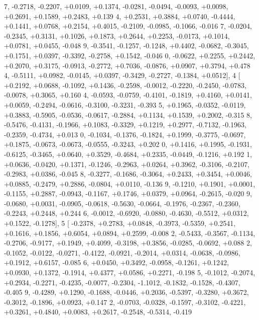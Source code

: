 \begin{DoxyCode}
      7, -0.2718, -0.2207, +0.0109, +0.1374, -0.0281, -0.0494, -0.0093, +0.0098, +0.2691, +0.1589, +0.2483, +0.139
      4, +0.2531, +0.3884, +0.0740, -0.4444, +0.1441, +0.0768, +0.2154, +0.4015, -0.2109, -0.0985, -0.1066, -0.016
      7, -0.0204, -0.2345, +0.3131, +0.1026, +0.1873, +0.2644, +0.2253, -0.0173, +0.1014, +0.0781, +0.0455, -0.048
      9, -0.3541, -0.1257, -0.1248, +0.4402, -0.0682, -0.3045, +0.1751, +0.0397, -0.3392, -0.2758, +0.1542, -0.046
      0, -0.0622, +0.2255, +0.2442, +0.2070, +0.3175, -0.0913, -0.2772, +0.7036, -0.0876, +0.0907, +0.3794, +0.478
      4, -0.5111, +0.0982, -0.0145, +0.0397, -0.3429, -0.2727, -0.1384, +0.0512],
4 [ +0.2192, +0.0688, -0.1092, +0.1436, -0.2598, -0.0012, -0.2220, -0.2450, -0.0783, -0.0078, +0.3065, +0.160
      4, -0.0593, -0.0759, -0.4101, -0.1819, +0.4160, +0.0141, +0.0059, -0.2494, -0.0616, -0.3100, -0.3231, -0.393
      5, +0.1965, -0.0352, -0.0119, +0.3883, -0.5905, -0.0536, -0.0617, -0.2884, +0.1134, +0.1539, +0.2002, -0.315
      8, -0.5476, -0.4131, -0.1966, +0.1083, -0.3329, +0.1219, +0.2977, -0.7132, -0.1963, -0.2359, -0.4734, +0.013
      0, -0.1034, -0.1376, -0.1824, +0.1999, -0.3775, -0.0697, +0.1875, -0.0673, -0.0673, -0.0555, -0.3243, +0.202
      0, +0.1416, +0.1995, -0.1931, -0.6125, -0.3465, +0.0640, +0.3529, -0.4684, +0.2335, -0.0449, -0.1216, +0.192
      1, +0.0636, -0.0420, +0.1371, -0.1246, -0.2963, +0.0264, +0.3962, -0.3106, -0.2107, -0.2983, +0.0386, -0.045
      8, -0.3277, -0.1686, -0.3064, +0.2433, +0.3454, +0.0046, +0.0885, -0.2479, +0.2886, -0.0804, +0.0110, -0.136
      9, -0.1210, +0.1901, +0.0001, -0.1155, +0.2887, -0.0943, -0.1167, +0.1746, +0.0379, +0.0964, -0.2615, -0.020
      9, -0.0680, +0.0031, -0.0905, -0.0618, -0.5630, -0.0664, -0.1976, -0.2367, -0.2360, -0.2243, +0.2448, +0.244
      6, -0.0012, -0.6920, -0.0880, -0.4630, -0.5512, +0.0312, +0.1522, -0.1278],
5 [ -0.2378, +0.2783, +0.0848, -0.3973, -0.5359, +0.2541, +0.1616, +0.1856, +0.6054, +0.0894, +0.2599, -0.008
      2, -0.5433, -0.3567, -0.1134, -0.2706, -0.9177, +0.1949, +0.4099, -0.3198, +0.3856, -0.0285, -0.0692, +0.088
      2, -0.1052, -0.0122, -0.0271, -0.4122, -0.0921, -0.2014, +0.0314, -0.0638, -0.0986, +0.1912, +0.6157, -0.085
      6, +0.0450, +0.3492, -0.0958, -0.1261, +0.1242, +0.0930, +0.1372, -0.1914, +0.4377, +0.0586, +0.2271, -0.198
      5, -0.1012, -0.2074, +0.2934, -0.2271, -0.4235, -0.0077, -0.2304, -1.1012, -0.1832, -0.1528, -0.4307, -0.405
      9, -0.4289, +0.1290, -0.1688, -0.0446, +0.2036, -0.5397, -0.3280, +0.3672, -0.3012, -0.1896, +0.0923, +0.147
      2, -0.0703, -0.0328, -0.1597, -0.3102, -0.4221, +0.3261, +0.4840, +0.0083, +0.2617, -0.2548, -0.5314, -0.419

\end{DoxyCode}
